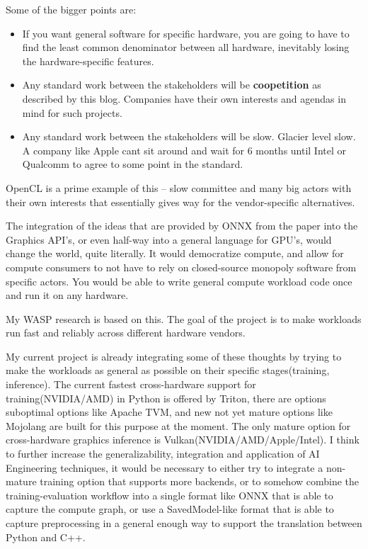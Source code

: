 \documentclass[a4paper, 11pt]{article} %
\begin{document}
Some of the bigger points are: 
\begin{itemize}
  \item If you want general software for specific hardware, you are going to have to find the least common denominator between all hardware, inevitably losing the hardware-specific features.
  \item Any standard work between the stakeholders will be \textbf{coopetition} as described by this blog\cite{modular_opencl}. Companies have their own interests and agendas in mind for such projects.
  \item Any standard work between the stakeholders will be slow. Glacier level slow. A company like Apple cant sit around and wait for 6 months until Intel or Qualcomm to agree to some point in the standard.
\end{itemize}
OpenCL is a prime example of this -- slow committee and many big actors with their own interests that essentially gives way for the vendor-specific alternatives.

The integration of the ideas that are provided by ONNX from the paper into the Graphics API's, or even half-way into a general language for GPU's, would change the world, quite literally. It would democratize compute, and allow for compute consumers to not have to rely
on closed-source monopoly software from specific actors. You would be able to write general compute workload code once and run it on any hardware.

My WASP research is based on this. The goal of the project is to make workloads run fast and reliably across different hardware vendors.

My current project is already integrating some of these thoughts by trying to make the workloads as general as possible on their specific stages(training, inference). 
The current fastest cross-hardware support for training(NVIDIA/AMD) in Python is offered by Triton, there are options suboptimal options like Apache TVM, and new not yet mature options like Mojolang are built for this purpose at the moment.
The only mature option for cross-hardware graphics inference is Vulkan(NVIDIA/AMD/Apple/Intel).
I think to further increase the generalizability, integration and application of AI Engineering techniques, it would be necessary to either try to integrate a non-mature training option that supports more backends, or to somehow combine the training-evaluation workflow into a single format like ONNX
that is able to capture the compute graph, or use a SavedModel-like format that is able to capture preprocessing in a general enough way to support the translation between Python and C++.
\end{document}
